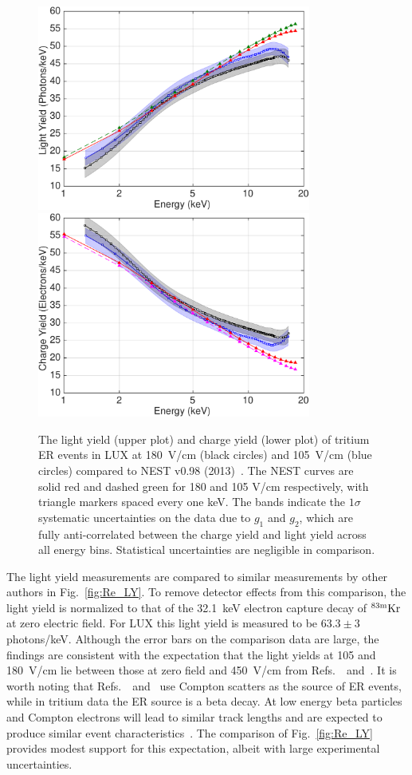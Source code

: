 \begin{figure}[t!]
\includegraphics[width=90mm]{fig7a.pdf}
\includegraphics[width=90mm]{fig7b.pdf}
\caption{The light yield (upper plot) and charge yield (lower plot) of tritium ER events in LUX at 180~V/cm (black circles) and 105~V/cm (blue circles) compared to NEST v0.98 (2013)~\cite{NEST_2013}. The NEST curves are solid red and dashed green for 180 and 105 V/cm respectively, with triangle markers spaced every one keV. The bands indicate the $1\sigma$ systematic uncertainties on the data due to $g_1$ and $g_2$, which are fully anti-correlated between the charge yield and light yield across all energy bins. Statistical uncertainties are negligible in comparison.}
\label{fig:ER-LY-QY}
\end{figure}

The light yield measurements are compared to similar measurements by other authors in Fig.~\ref{fig:Re_LY}. To remove detector effects from this comparison, the light yield is normalized to that of the 32.1~keV electron capture decay of $\rm ^{83m} Kr$ at zero electric field. For LUX this light yield is measured to be $ 63.3 \pm 3$ photons/keV. Although the error bars on the comparison data are large, the findings are consistent with the expectation that the light yields at 105 and 180~V/cm lie between those at zero field and 450~V/cm from Refs.~\cite{Aprile_LY}~and~\cite{Baudis}. It is worth noting that Refs.~\cite{Aprile_LY}~and~\cite{Baudis} use Compton scatters as the source of ER events, while in tritium data the ER source is a beta decay. At low energy beta particles and Compton electrons will lead to similar track lengths and are expected to produce similar event characteristics~\cite{NEST_2013}. The comparison of Fig.~\ref{fig:Re_LY} provides modest support for this expectation, albeit with large experimental uncertainties.

